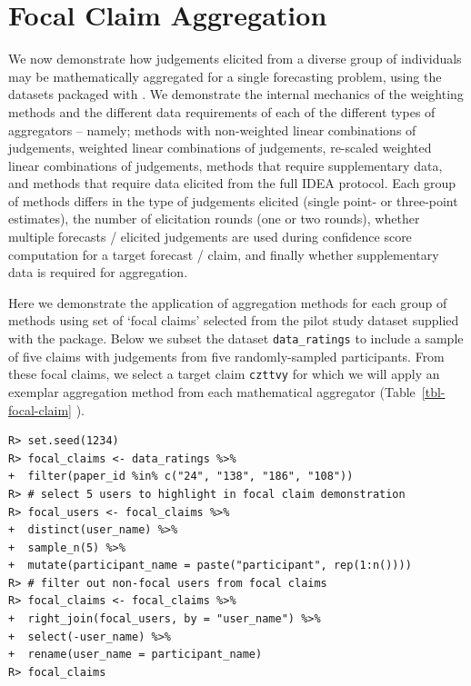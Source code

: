 \documentclass[article]{jss}
\begin{document}
\hypertarget{focal-claim-aggregation}{%
\section{Focal Claim Aggregation}\label{focal-claim-aggregation}}

We now demonstrate how judgements elicited from a diverse group of
individuals may be mathematically aggregated for a single forecasting
problem, using the datasets packaged with . We demonstrate
the internal mechanics of the weighting methods and the different data
requirements of each of the different types of aggregators -- namely;
methods with non-weighted linear combinations of judgements, weighted
linear combinations of judgements, re-scaled weighted linear
combinations of judgements, methods that require supplementary data, and
methods that require data elicited from the full IDEA protocol. Each
group of methods differs in the type of judgements elicited (single
point- or three-point estimates), the number of elicitation rounds (one
or two rounds), whether multiple forecasts / elicited judgements are
used during confidence score computation for a target forecast / claim,
and finally whether supplementary data is required for aggregation.

Here we demonstrate the application of aggregation methods for each
group of methods using set of `focal claims' selected from the pilot
study dataset supplied with the  package. Below we subset
the dataset \texttt{data\_ratings} to include a sample of five claims
with judgements from five randomly-sampled participants. From these
focal claims, we select a target claim \texttt{czttvy} for which we will
apply an exemplar aggregation method from each mathematical aggregator
(Table~\ref{tbl-focal-claim} ).

\begin{verbatim}
R> set.seed(1234)
R> focal_claims <- data_ratings %>% 
+  filter(paper_id %in% c("24", "138", "186", "108"))
R> # select 5 users to highlight in focal claim demonstration
R> focal_users <- focal_claims %>% 
+  distinct(user_name) %>% 
+  sample_n(5) %>% 
+  mutate(participant_name = paste("participant", rep(1:n())))
R> # filter out non-focal users from focal claims
R> focal_claims <- focal_claims %>%  
+  right_join(focal_users, by = "user_name") %>% 
+  select(-user_name) %>% 
+  rename(user_name = participant_name)
R> focal_claims
\end{verbatim}
\end{document}
